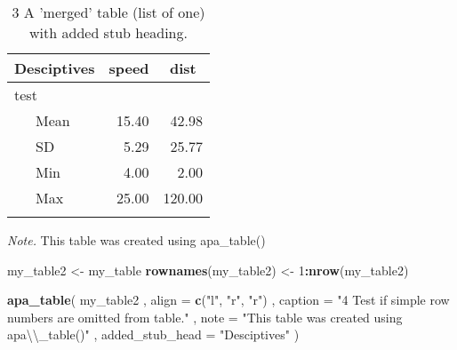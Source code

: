 \documentclass[english,man]{apa6}
\newenvironment{Shaded}{\begin{snugshade}}{\end{snugshade}}
\newcommand{\KeywordTok}[1]{\textcolor[rgb]{0.13,0.29,0.53}{\textbf{#1}}}
\newcommand{\DataTypeTok}[1]{\textcolor[rgb]{0.13,0.29,0.53}{#1}}
\newcommand{\DecValTok}[1]{\textcolor[rgb]{0.00,0.00,0.81}{#1}}
\newcommand{\CharTok}[1]{\textcolor[rgb]{0.31,0.60,0.02}{#1}}
\newcommand{\StringTok}[1]{\textcolor[rgb]{0.31,0.60,0.02}{#1}}
\newcommand{\OperatorTok}[1]{\textcolor[rgb]{0.81,0.36,0.00}{\textbf{#1}}}
\newcommand{\NormalTok}[1]{#1}
\theoremstyle{definition}
\theoremstyle{definition}
\theoremstyle{definition}
\theoremstyle{remark}
\begin{document}
\begin{table}[tbp]
\begin{center}
\begin{threeparttable}
\caption{\label{tab:unnamed-chunk-4}3 A 'merged' table (list of one) with added stub heading.}
\begin{tabular}{lrr}
\toprule
Desciptives & \multicolumn{1}{c}{speed} & \multicolumn{1}{c}{dist}\\
\midrule
test &  & \\
\ \ \ Mean & 15.40 & 42.98\\
\ \ \ SD & 5.29 & 25.77\\
\ \ \ Min & 4.00 & 2.00\\
\ \ \ Max & 25.00 & 120.00\\
\bottomrule
\addlinespace
\end{tabular}
\begin{tablenotes}[para]
\textit{Note.} This table was created using apa\_table()
\end{tablenotes}
\end{threeparttable}
\end{center}
\end{table}

\begin{Shaded}
\begin{Highlighting}[]
\NormalTok{my_table2 <-}\StringTok{ }\NormalTok{my_table}
\KeywordTok{rownames}\NormalTok{(my_table2) <-}\StringTok{ }\DecValTok{1}\OperatorTok{:}\KeywordTok{nrow}\NormalTok{(my_table2)}

\KeywordTok{apa_table}\NormalTok{(}
\NormalTok{  my_table2}
\NormalTok{  , }\DataTypeTok{align =} \KeywordTok{c}\NormalTok{(}\StringTok{"l"}\NormalTok{, }\StringTok{"r"}\NormalTok{, }\StringTok{"r"}\NormalTok{)}
\NormalTok{  , }\DataTypeTok{caption =} \StringTok{"4 Test if simple row numbers are omitted from table."}
\NormalTok{  , }\DataTypeTok{note =} \StringTok{"This table was created using apa}\CharTok{\textbackslash{}\textbackslash{}}\StringTok{_table()"}
\NormalTok{  , }\DataTypeTok{added_stub_head =} \StringTok{"Desciptives"}
\NormalTok{)}
\end{Highlighting}
\end{Shaded}
\end{document}
